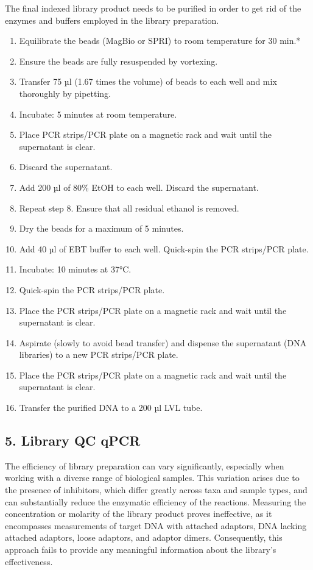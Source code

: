 \documentclass[
]{book}
\providecommand{\tightlist}{%
  \setlength{\itemsep}{0pt}\setlength{\parskip}{0pt}}
\begin{document}
The final indexed library product needs to be purified in order to get rid of the enzymes and buffers employed in the library preparation.

\begin{enumerate}
\def\labelenumi{\arabic{enumi}.}
\tightlist
\item
  Equilibrate the beads (MagBio or SPRI) to room temperature for 30 min.*
\item
  Ensure the beads are fully resuspended by vortexing.
\item
  Transfer 75 µl (1.67 times the volume) of beads to each well and mix thoroughly by pipetting.
\item
  Incubate: 5 minutes at room temperature.
\item
  Place PCR strips/PCR plate on a magnetic rack and wait until the supernatant is clear.
\item
  Discard the supernatant.
\item
  Add 200 µl of 80\% EtOH to each well. Discard the supernatant.
\item
  Repeat step 8. Ensure that all residual ethanol is removed.
\item
  Dry the beads for a maximum of 5 minutes.
\item
  Add 40 µl of EBT buffer to each well. Quick-spin the PCR strips/PCR plate.
\item
  Incubate: 10 minutes at 37°C.
\item
  Quick-spin the PCR strips/PCR plate.
\item
  Place the PCR strips/PCR plate on a magnetic rack and wait until the supernatant is clear.
\item
  Aspirate (slowly to avoid bead transfer) and dispense the supernatant (DNA libraries) to a new PCR strips/PCR plate.
\item
  Place the PCR strips/PCR plate on a magnetic rack and wait until the supernatant is clear.
\item
  Transfer the purified DNA to a 200 µl LVL tube.
\end{enumerate}

\hypertarget{library-preparation-qpcr}{%
\subsection*{5. Library QC qPCR}\label{library-preparation-qpcr}}

The efficiency of library preparation can vary significantly, especially when working with a diverse range of biological samples. This variation arises due to the presence of inhibitors, which differ greatly across taxa and sample types, and can substantially reduce the enzymatic efficiency of the reactions. Measuring the concentration or molarity of the library product proves ineffective, as it encompasses measurements of target DNA with attached adaptors, DNA lacking attached adaptors, loose adaptors, and adaptor dimers. Consequently, this approach fails to provide any meaningful information about the library's effectiveness.
\end{document}
